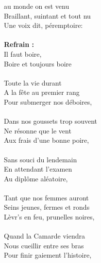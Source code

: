 
 au monde on est venu \bissimple
\\Braillant, suintant et tout nu \bissimple
\\Une voix dit, péremptoire:
\\\\\textbf{Refrain :}
\\Il faut boire, \bissimple
\\Boire et toujours boire
\\\\Toute la vie durant \bissimple
\\A la fête au premier rang \bissimple
\\Pour submerger nos déboires,
\\\\Dans nos goussets trop souvent \bissimple
\\Ne résonne que le vent \bissimple
\\Aux frais d'une bonne poire,
\\\\Sans souci du lendemain \bissimple
\\En attendant l'examen \bissimple
\\Au diplôme aléatoire,
\\\\Tant que nos femmes auront \bissimple
\\Seins jeunes, fermes et ronds \bissimple
\\Lèvr's en feu, prunelles noires,
\\\\Quand la Camarde viendra \bissimple
\\Nous cueillir entre ses bras \bissimple
\\Pour finir gaiement l'histoire,

\breakpage